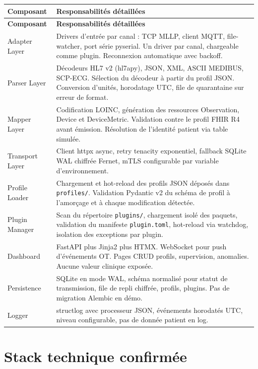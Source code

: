 \bridgezebra
\begin{longtable}{p{3.5cm}p{11cm}}
  \toprule
  \rowcolor{bridgeblue!90}
  {\color{white}\bfseries Composant} & {\color{white}\bfseries Responsabilités détaillées} \\
  \midrule
  \endfirsthead
  \toprule
  \rowcolor{bridgeblue!90}
  {\color{white}\bfseries Composant} & {\color{white}\bfseries Responsabilités détaillées} \\
  \midrule
  \endhead
  \bottomrule
  \endfoot
  Adapter Layer & Drivers d'entrée par canal : TCP MLLP, client MQTT, file-watcher, port série pyserial. Un driver par canal, chargeable comme plugin. Reconnexion automatique avec backoff. \\
  Parser Layer & Décodeurs HL7 v2 (hl7apy), JSON, XML, ASCII MEDIBUS, SCP-ECG. Sélection du décodeur à partir du profil JSON. Conversion d'unités, horodatage UTC, file de quarantaine sur erreur de format. \\
  Mapper Layer & Codification LOINC, génération des ressources Observation, Device et DeviceMetric. Validation contre le profil FHIR R4 avant émission. Résolution de l'identité patient via table simulée. \\
  Transport Layer & Client httpx async, retry tenacity exponentiel, fallback SQLite WAL chiffrée Fernet, mTLS configurable par variable d'environnement. \\
  Profile Loader & Chargement et hot-reload des profils JSON déposés dans \texttt{profiles/}. Validation Pydantic v2 du schéma de profil à l'amorçage et à chaque modification détectée. \\
  Plugin Manager & Scan du répertoire \texttt{plugins/}, chargement isolé des paquets, validation du manifeste \texttt{plugin.toml}, hot-reload via watchdog, isolation des exceptions par plugin. \\
  Dashboard & FastAPI plus Jinja2 plus HTMX. WebSocket pour push d'événements OT. Pages CRUD profils, supervision, anomalies. Aucune valeur clinique exposée. \\
  Persistence & SQLite en mode WAL, schéma normalisé pour statut de transmission, file de repli chiffrée, profils, plugins. Pas de migration Alembic en démo. \\
  Logger & structlog avec processeur JSON, événements horodatés UTC, niveau configurable, pas de donnée patient en log. \\
\end{longtable}

\section{Stack technique confirmée}
\label{sec:archi-stack}

